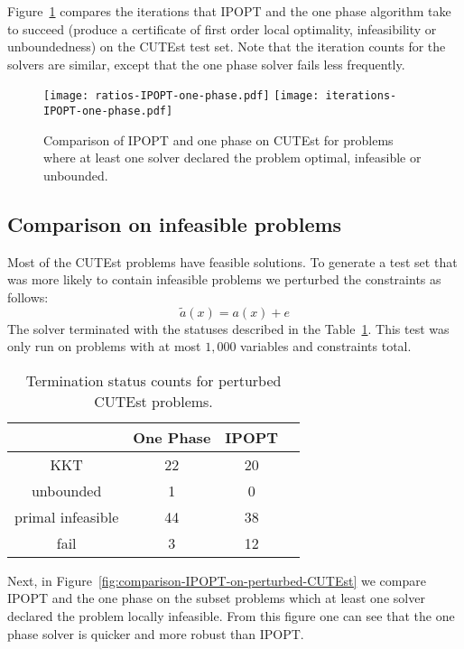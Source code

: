 \documentclass{article}
\begin{document}
Figure~\ref{fig:comparison-IPOPT-on-CUTEst} compares the iterations that IPOPT and the one phase algorithm take to succeed (produce a certificate of first order local optimality, infeasibility or unboundedness) on the CUTEst test set. Note that the iteration counts for the solvers are similar, except that the one phase solver fails less frequently.


\begin{figure}[H]
\texttt{[image: ratios-IPOPT-one-phase.pdf]}
\texttt{[image: iterations-IPOPT-one-phase.pdf]}
\caption{Comparison of IPOPT and one phase on CUTEst for problems where at least one solver declared the problem optimal, infeasible or unbounded.}\label{fig:comparison-IPOPT-on-CUTEst}
\end{figure}


\subsection{Comparison on infeasible problems}\label{sec:infeas}

Most of the CUTEst problems have feasible solutions. To generate a test set that was more likely to contain infeasible problems we perturbed the constraints as follows:
$$
\tilde{a}(x) = a(x) + e
$$
The solver terminated with the statuses described in the Table~\ref{tbl:termination-status-counts-peturbed}. This test was only run on problems with at most $1,000$ variables and constraints total.
\begin{table}[H]
\caption{Termination status counts for perturbed CUTEst problems.}\label{tbl:termination-status-counts-peturbed}
\begin{tabular}{ c c c r }
 &  One Phase &  IPOPT &  \\
  \hline
KKT & 22 & 20 \\
unbounded & 1 & 0  \\
primal infeasible & 44 &  38 \\
fail & 3 & 12 \\
\end{tabular}
\end{table}

Next, in Figure~\ref{fig:comparison-IPOPT-on-perturbed-CUTEst} we compare IPOPT and the one phase on the subset problems which at least one solver declared the problem locally infeasible. From this figure one can see that the one phase solver is quicker and more robust than IPOPT.
\end{document}
